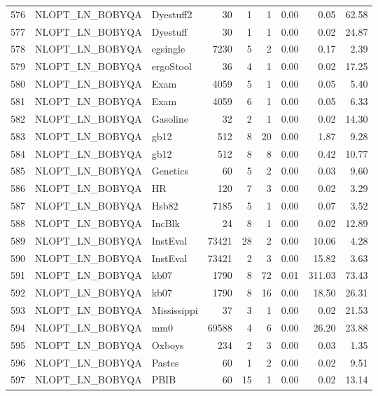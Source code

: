 \documentclass[article]{jss}
\begin{document}
\begin{table}[htbp]
\begin{tabular}{rllrrrrrr}
  576 & NLOPT\_LN\_BOBYQA & Dyestuff2 &  30 &   1 &   1 & 0.00 & 0.05 & 62.58 \\ 
  577 & NLOPT\_LN\_BOBYQA & Dyestuff &  30 &   1 &   1 & 0.00 & 0.02 & 24.87 \\ 
  578 & NLOPT\_LN\_BOBYQA & egsingle & 7230 &   5 &   2 & 0.00 & 0.17 & 2.39 \\ 
  579 & NLOPT\_LN\_BOBYQA & ergoStool &  36 &   4 &   1 & 0.00 & 0.02 & 17.25 \\ 
  580 & NLOPT\_LN\_BOBYQA & Exam & 4059 &   5 &   1 & 0.00 & 0.05 & 5.40 \\ 
  581 & NLOPT\_LN\_BOBYQA & Exam & 4059 &   6 &   1 & 0.00 & 0.05 & 6.33 \\ 
  582 & NLOPT\_LN\_BOBYQA & Gasoline &  32 &   2 &   1 & 0.00 & 0.02 & 14.30 \\ 
  583 & NLOPT\_LN\_BOBYQA & gb12 & 512 &   8 &  20 & 0.00 & 1.87 & 9.28 \\ 
  584 & NLOPT\_LN\_BOBYQA & gb12 & 512 &   8 &   8 & 0.00 & 0.42 & 10.77 \\ 
  585 & NLOPT\_LN\_BOBYQA & Genetics &  60 &   5 &   2 & 0.00 & 0.03 & 9.60 \\ 
  586 & NLOPT\_LN\_BOBYQA & HR & 120 &   7 &   3 & 0.00 & 0.02 & 3.29 \\ 
  587 & NLOPT\_LN\_BOBYQA & Hsb82 & 7185 &   5 &   1 & 0.00 & 0.07 & 3.52 \\ 
  588 & NLOPT\_LN\_BOBYQA & IncBlk &  24 &   8 &   1 & 0.00 & 0.02 & 12.89 \\ 
  589 & NLOPT\_LN\_BOBYQA & InstEval & 73421 &  28 &   2 & 0.00 & 10.06 & 4.28 \\ 
  590 & NLOPT\_LN\_BOBYQA & InstEval & 73421 &   2 &   3 & 0.00 & 15.82 & 3.63 \\ 
  591 & NLOPT\_LN\_BOBYQA & kb07 & 1790 &   8 &  72 & 0.01 & 311.03 & 73.43 \\ 
  592 & NLOPT\_LN\_BOBYQA & kb07 & 1790 &   8 &  16 & 0.00 & 18.50 & 26.31 \\ 
  593 & NLOPT\_LN\_BOBYQA & Mississippi &  37 &   3 &   1 & 0.00 & 0.02 & 21.53 \\ 
  594 & NLOPT\_LN\_BOBYQA & mm0 & 69588 &   4 &   6 & 0.00 & 26.20 & 23.88 \\ 
  595 & NLOPT\_LN\_BOBYQA & Oxboys & 234 &   2 &   3 & 0.00 & 0.03 & 1.35 \\ 
  596 & NLOPT\_LN\_BOBYQA & Pastes &  60 &   1 &   2 & 0.00 & 0.02 & 9.51 \\ 
  597 & NLOPT\_LN\_BOBYQA & PBIB &  60 &  15 &   1 & 0.00 & 0.02 & 13.14 \\ 

\end{tabular}
\end{table}
\end{document}
